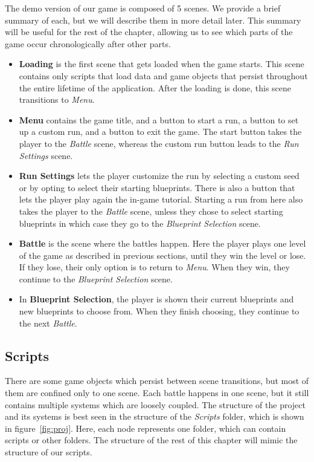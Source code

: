 The demo version of our game is composed of 5 scenes.
We provide a brief summary of each, but we will describe them in more detail later.
This summary will be useful for the rest of the chapter, allowing us to see which parts of the game occur chronologically after other parts.
\begin{itemize}
    \item \textbf{Loading} is the first scene that gets loaded when the game starts.
          This scene contains only scripts that load data and game objects that persist throughout the entire lifetime of the application.
          After the loading is done, this scene transitions to \emph{Menu}.
    \item \textbf{Menu} contains the game title, and a button to start a run, a button to set up a custom run, and a button to exit the game.
          The start button takes the player to the \emph{Battle} scene, whereas the custom run button leads to the \emph{Run Settings} scene.
    \item \textbf{Run Settings} lets the player customize the run by selecting a custom seed or by opting to select their starting blueprints.
          There is also a button that lets the player play again the in-game tutorial.
          Starting a run from here also takes the player to the \emph{Battle} scene, unless they chose to select starting blueprints in which case they go to the \emph{Blueprint Selection} scene.
    \item \textbf{Battle} is the scene where the battles happen.
          Here the player plays one level of the game as described in previous sections, until they win the level or lose.
          If they lose, their only option is to return to \emph{Menu}.
          When they win, they continue to the \emph{Blueprint Selection} scene.
    \item In \textbf{Blueprint Selection}, the player is shown their current blueprints and new blueprints to choose from.
          When they finish choosing, they continue to the next \emph{Battle}.
\end{itemize}

\subsection{Scripts}

There are some game objects which persist between scene transitions, but most of them are confined only to one scene.
Each battle happens in one scene, but it still contains multiple systems which are loosely coupled.
The structure of the project and its systems is best seen in the structure of the \emph{Scripts} folder, which is shown in figure~\ref{fig:proj}.
Here, each node represents one folder, which can contain scripts or other folders.
The structure of the rest of this chapter will mimic the structure of our scripts.

